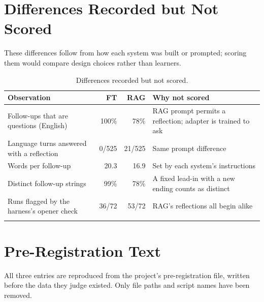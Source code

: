 \documentclass[pdflatex,sn-mathphys-num]{sn-jnl}%
\theoremstyle{thmstyleone}%
\theoremstyle{thmstyletwo}%
\theoremstyle{thmstylethree}%
\begin{document}
\begin{appendices}
\section{Differences Recorded but Not Scored}\label{app:notscored}

These differences follow from how each system was built or prompted; scoring them would compare design choices rather than learners.

\begin{table}[h]
\caption{Differences recorded but not scored.}\label{tab:notscored}
\footnotesize
\begin{tabular*}{\textwidth}{@{\extracolsep\fill}p{}rrp{}}
\toprule
Observation & FT & RAG & Why not scored \\
\midrule
Follow-ups that are questions (English) & 100\% & 78\% & RAG prompt permits a reflection; adapter is trained to ask \\
Language turns answered with a reflection & 0/525 & 21/525 & Same prompt difference \\
Words per follow-up & 20.3 & 16.9 & Set by each system's instructions \\
Distinct follow-up strings & 99\% & 78\% & A fixed lead-in with a new ending counts as distinct \\
Runs flagged by the harness's opener check & 36/72 & 53/72 & RAG's reflections all begin alike \\
\botrule
\end{tabular*}
\end{table}

\section{Pre-Registration Text}\label{app:prereg}

All three entries are reproduced from the project's pre-registration file, written before the data
they judge existed. Only file paths and script names have been removed.


\end{appendices}
\end{document}
